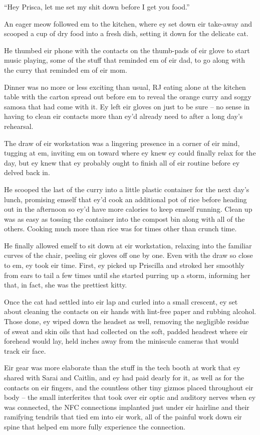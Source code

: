 ``Hey Prisca, let me set my shit down before I get you food.''

An eager meow followed em to the kitchen, where ey set down eir take-away and scooped a cup of dry food into a fresh dish, setting it down for the delicate cat.

He thumbed eir phone with the contacts on the thumb-pads of eir glove to start music playing, some of the stuff that reminded em of eir dad, to go along with the curry that reminded em of eir mom.

Dinner was no more or less exciting than usual, RJ eating alone at the kitchen table with the carton spread out before em to reveal the orange curry and soggy samosa that had come with it. Ey left eir gloves on just to be sure -- no sense in having to clean eir contacts more than ey'd already need to after a long day's rehearsal.

The draw of eir workstation was a lingering presence in a corner of eir mind, tugging at em, inviting em on toward where ey knew ey could finally relax for the day, but ey knew that ey probably ought to finish all of eir routine before ey delved back in.

He scooped the last of the curry into a little plastic container for the next day's lunch, promising emself that ey'd cook an additional pot of rice before heading out in the afternoon so ey'd have more calories to keep emself running. Clean up was as easy as tossing the container into the compost bin along with all of the others. Cooking much more than rice was for times other than crunch time.

He finally allowed emelf to sit down at eir workstation, relaxing into the familiar curves of the chair, peeling eir gloves off one by one. Even with the draw so close to em, ey took eir time. First, ey picked up Priscilla and stroked her smoothly from ears to tail a few times until she started purring up a storm, informing her that, in fact, she was the prettiest kitty.

Once the cat had settled into eir lap and curled into a small crescent, ey set about cleaning the contacts on eir hands with lint-free paper and rubbing alcohol. Those done, ey wiped down the headset as well, removing the negligible residue of sweat and skin oils that had collected on the soft, padded headrest where eir forehead would lay, held inches away from the miniscule cameras that would track eir face.

Eir gear was more elaborate than the stuff in the tech booth at work that ey shared with Sarai and Caitlin, and ey had paid dearly for it, as well as for the contacts on eir fingers, and the countless other tiny gizmos placed throughout eir body -- the small interferites that took over eir optic and auditory nerves when ey was connected, the NFC connections implanted just under eir hairline and their ramifying tendrils that tied em into eir work, all of the painful work down eir spine that helped em more fully experience the connection.

